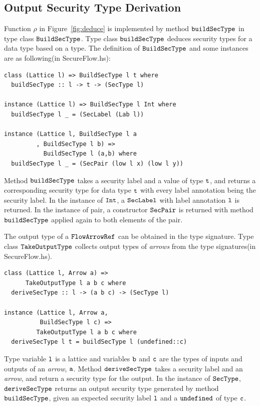 \documentclass[a4paper]{report}
\newcommand{\co}[1]{$\cod{#1}$}
\begin{document}
\subsection{Output Security Type Derivation}
\label{chap5:lowerA:old}
Function $\rho$ in Figure~\ref{fig:deduce} is implemented by method \co{buildSecType} in type class \co{BuildSecType}. 
Type class \co{buildSecType} deduces security types for a data type based on a type.
The definition of \co{BuildSecType} and some instances are as following(in SecureFlow.hs): 
\begin{Verbatim}[fontsize=\footnotesize]
class (Lattice l) => BuildSecType l t where
  buildSecType :: l -> t -> (SecType l)

instance (Lattice l) => BuildSecType l Int where
  buildSecType l _ = (SecLabel (Lab l))

instance (Lattice l, BuildSecType l a
         , BuildSecType l b) =>
           BuildSecType l (a,b) where
  buildSecType l _ = (SecPair (low l x) (low l y))
\end{Verbatim}
Method \co{buildSecType} takes a security label and a value of type \co{t}, and returns a corresponding security type 
for data type \co{t} with every label annotation being the security label.
In the instance of \co{Int}, a \co{SecLabel} with label annotation \co{l} is returned. 
In the instance of pair, a constructor \co{SecPair} is returned with method \co{buildSecType} applied again to both 
elements of the pair.

The output type of a \co{FlowArrowRef} can be obtained in the type signature. 
Type class \co{TakeOutputType} collects output types of {\em arrows} from
the type signatures(in SecureFlow.hs).
\begin{Verbatim}[fontsize=\footnotesize]
class (Lattice l, Arrow a) =>
      TakeOutputType l a b c where
  deriveSecType :: l -> (a b c) -> (SecType l)

instance (Lattice l, Arrow a,
          BuildSecType l c) =>
         TakeOutputType l a b c where
  deriveSecType l t = buildSecType l (undefined::c)
\end{Verbatim}
Type variable \co{l} is a lattice and variables \co{b} and \co{c} are the types of 
inputs and outputs of an {\em arrow}, \co{a}.
Method \co{deriveSecType} takes a security label and an {\em arrow}, and return a security type for the output.
In the instance of \co{SecType}, \co{deriveSecType} returns an output security
type generated by method \co{buildSecType}, given an expected security label \co{l} and a \co{undefined} 
of type \co{c}.
\end{document}
